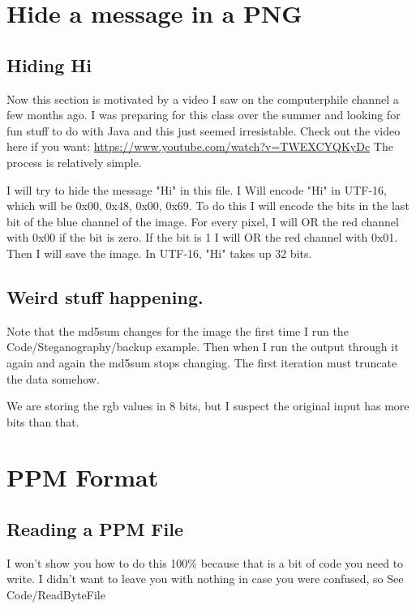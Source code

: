 \documentclass[12pt]{article}
\begin{document}
\section{Hide a message in a PNG}

\subsection{Hiding Hi}
Now this section is motivated by a video I saw on the computerphile channel a few months ago. I was preparing for this class over the summer and looking for fun stuff to do with Java and this just seemed irresistable. Check out the video here if you want: \url{https://www.youtube.com/watch?v=TWEXCYQKyDc} The process is relatively simple. 

I will try to hide the message "Hi" in this file. I Will encode "Hi" in UTF-16, which will be 0x00, 0x48, 0x00, 0x69. To do this I will encode the bits in the last bit of the blue channel of the image. For every  pixel, I will OR the red channel with 0x00 if the bit is zero. If the bit is 1 I will OR the red channel with 0x01. Then I will save the image. In UTF-16, "Hi" takes up 32 bits.

\subsection{Weird stuff happening.}
Note that the md5sum changes for the image the first time I run the Code/Steganography/backup example. Then when I run the output through it again and again the md5sum stops changing. The first iteration must truncate the data somehow.

We are storing the rgb values in 8 bits, but I suspect the original input has more bits than that.

\section{PPM Format}

\subsection{Reading a PPM File}

I won't show you how to do this 100\% because that is a bit of code you need to write. I didn't want to leave you with nothing in case you were confused, so See Code/ReadByteFile


\end{document}
